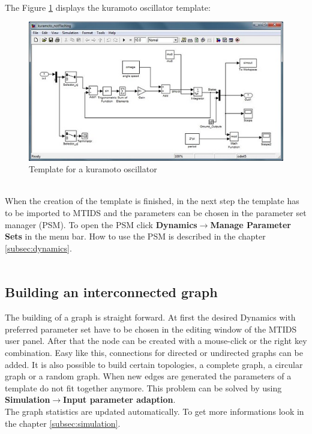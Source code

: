 \documentclass[12pt]{report}
\begin{document}
\\
\\
\\
\\
\\
\\
The Figure \ref{FIG:abb42} displays the kuramoto oscillator template:
\begin{figure}[h]
\centering
\includegraphics[scale=.4]{templatekuramoto}
\caption{Template for a kuramoto oscillator}
\label{FIG:abb42}
\end{figure}
\\
When the creation of the template is finished, in the next step the template has to be imported to MTIDS and the parameters can be chosen in the parameter set manager (PSM). To open the PSM click \textbf{Dynamics$\rightarrow$Manage Parameter Sets} in the menu bar. How to use the PSM is described in the chapter \ref{subsec:dynamics}.\\
\\
\subsection{Building an interconnected graph}
The building of a graph is straight forward. At first the desired Dynamics with preferred parameter set have to be chosen in the editing window of the MTIDS user panel. After that the node can be created with a mouse-click or the right key combination. Easy like this, connections for directed or undirected graphs can be added. It is also possible to build certain topologies, a complete graph, a circular graph or a random graph. When new edges are generated the parameters of a template do not fit together anymore. This problem can be solved by using \textbf{Simulation$\rightarrow$Input parameter adaption}.\\
The graph statistics are updated automatically. To get more informations look in the chapter \ref{subsec:simulation}.\\
\\
\end{document}
